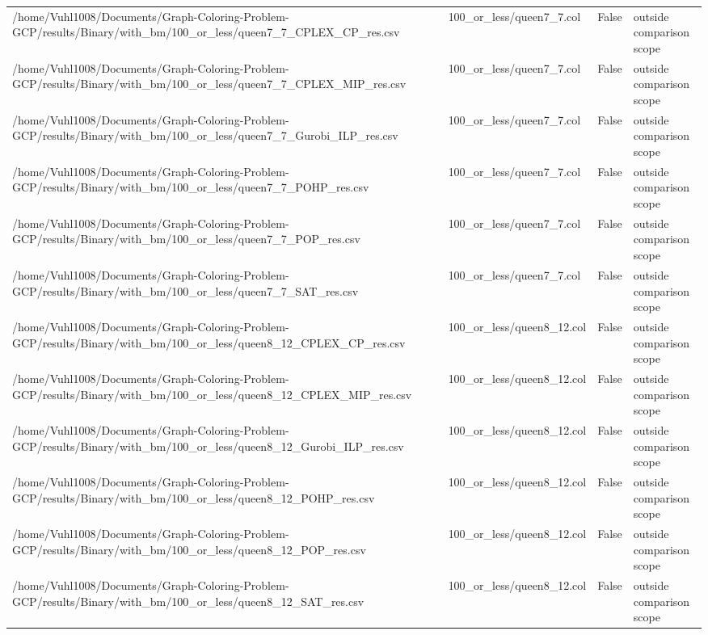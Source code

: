 \begin{table}[htbp]
\begin{tabular}{llll}
/home/Vuhl1008/Documents/Graph-Coloring-Problem-GCP/results/Binary/with\_bm/100\_or\_less/queen7\_7\_CPLEX\_CP\_res.csv & 100\_or\_less/queen7\_7.col & False & outside comparison scope \\
/home/Vuhl1008/Documents/Graph-Coloring-Problem-GCP/results/Binary/with\_bm/100\_or\_less/queen7\_7\_CPLEX\_MIP\_res.csv & 100\_or\_less/queen7\_7.col & False & outside comparison scope \\
/home/Vuhl1008/Documents/Graph-Coloring-Problem-GCP/results/Binary/with\_bm/100\_or\_less/queen7\_7\_Gurobi\_ILP\_res.csv & 100\_or\_less/queen7\_7.col & False & outside comparison scope \\
/home/Vuhl1008/Documents/Graph-Coloring-Problem-GCP/results/Binary/with\_bm/100\_or\_less/queen7\_7\_POHP\_res.csv & 100\_or\_less/queen7\_7.col & False & outside comparison scope \\
/home/Vuhl1008/Documents/Graph-Coloring-Problem-GCP/results/Binary/with\_bm/100\_or\_less/queen7\_7\_POP\_res.csv & 100\_or\_less/queen7\_7.col & False & outside comparison scope \\
/home/Vuhl1008/Documents/Graph-Coloring-Problem-GCP/results/Binary/with\_bm/100\_or\_less/queen7\_7\_SAT\_res.csv & 100\_or\_less/queen7\_7.col & False & outside comparison scope \\
/home/Vuhl1008/Documents/Graph-Coloring-Problem-GCP/results/Binary/with\_bm/100\_or\_less/queen8\_12\_CPLEX\_CP\_res.csv & 100\_or\_less/queen8\_12.col & False & outside comparison scope \\
/home/Vuhl1008/Documents/Graph-Coloring-Problem-GCP/results/Binary/with\_bm/100\_or\_less/queen8\_12\_CPLEX\_MIP\_res.csv & 100\_or\_less/queen8\_12.col & False & outside comparison scope \\
/home/Vuhl1008/Documents/Graph-Coloring-Problem-GCP/results/Binary/with\_bm/100\_or\_less/queen8\_12\_Gurobi\_ILP\_res.csv & 100\_or\_less/queen8\_12.col & False & outside comparison scope \\
/home/Vuhl1008/Documents/Graph-Coloring-Problem-GCP/results/Binary/with\_bm/100\_or\_less/queen8\_12\_POHP\_res.csv & 100\_or\_less/queen8\_12.col & False & outside comparison scope \\
/home/Vuhl1008/Documents/Graph-Coloring-Problem-GCP/results/Binary/with\_bm/100\_or\_less/queen8\_12\_POP\_res.csv & 100\_or\_less/queen8\_12.col & False & outside comparison scope \\
/home/Vuhl1008/Documents/Graph-Coloring-Problem-GCP/results/Binary/with\_bm/100\_or\_less/queen8\_12\_SAT\_res.csv & 100\_or\_less/queen8\_12.col & False & outside comparison scope \\

\end{tabular}
\end{table}
